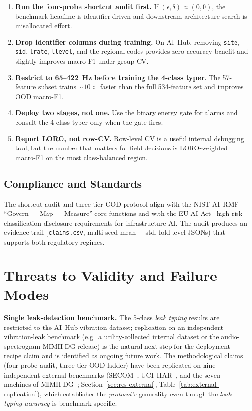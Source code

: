 \documentclass[3p,times,authoryear]{elsarticle}
\theoremstyle{remark}
\begin{document}
\begin{enumerate}
\item \textbf{Run the four-probe shortcut audit first.} If
$(\epsilon, \delta) \approx (0, 0)$, the benchmark headline is
identifier-driven and downstream architecture search is
misallocated effort.

\item \textbf{Drop identifier columns during training.} On
AI~Hub, removing \texttt{site}, \texttt{sid},
\texttt{lrate}, \texttt{llevel}, and the regional codes
provides zero accuracy benefit and slightly improves macro-F1
under group-CV.

\item \textbf{Restrict to 65--422~Hz before training the
4-class typer.} The 57-feature subset trains $\sim 10\times$
faster than the full 534-feature set and improves OOD macro-F1.

\item \textbf{Deploy two stages, not one.} Use the binary
energy gate for alarms and consult the 4-class typer only when
the gate fires.

\item \textbf{Report LORO, not row-CV.} Row-level CV is a
useful internal debugging tool, but the number that matters
for field decisions is LORO-weighted macro-F1 on the most
class-balanced region.
\end{enumerate}

\subsection{Compliance and Standards}

The shortcut audit and three-tier OOD protocol align with the
NIST AI~RMF~\cite{nist2023airmf} ``Govern --- Map --- Measure''
core functions and with the EU AI Act~\cite{eu2024aiact}
high-risk-classification disclosure requirements for
infrastructure AI. The audit produces an evidence trail
(\texttt{claims.csv}, multi-seed mean $\pm$ std, fold-level
JSONs) that supports both regulatory regimes.

\section{Threats to Validity and Failure Modes}\label{sec:threats}

\textbf{Single leak-detection benchmark.}
The 5-class \emph{leak typing} results are restricted to the
AI~Hub vibration dataset; replication on an independent
vibration-leak benchmark (e.g.\ a utility-collected internal
dataset or the audio-spectrogram MIMII-DG release) is the
natural next step for the deployment-recipe claim and is
identified as ongoing future work. The methodological claims
(four-probe audit, three-tier OOD ladder) have been
replicated on nine independent external benchmarks
(SECOM~\cite{mccann2008secom}, UCI~HAR~\cite{anguita2013har},
and the seven machines of
MIMII-DG~\cite{dohi2022mimii}; Section~\ref{sec:res-external},
Table~\ref{tab:external-replication}), which establishes the
\emph{protocol's} generality even though the
\emph{leak-typing accuracy} is benchmark-specific.
\end{document}
